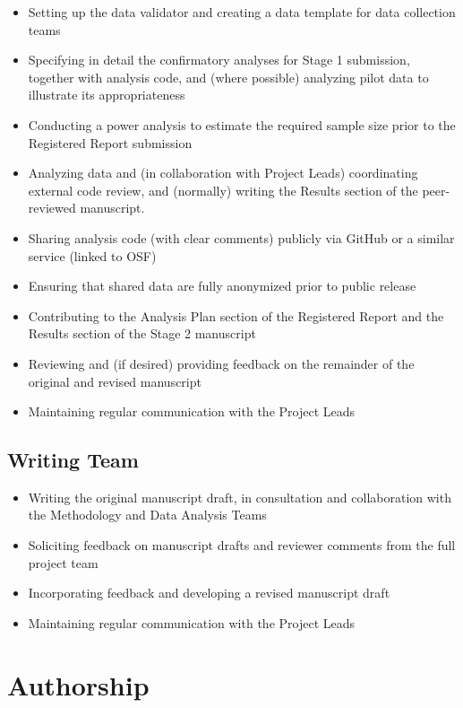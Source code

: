 \documentclass[
  letterpaper,
  DIV=11,
  numbers=noendperiod,
  oneside]{scrreprt}
\providecommand{\tightlist}{%
  \setlength{\itemsep}{0pt}\setlength{\parskip}{0pt}}
\begin{document}
\begin{itemize}
\tightlist
\item
  Setting up the data validator and creating a data template for data
  collection teams
\item
  Specifying in detail the confirmatory analyses for Stage 1 submission,
  together with analysis code, and (where possible) analyzing pilot data
  to illustrate its appropriateness
\item
  Conducting a power analysis to estimate the required sample size prior
  to the Registered Report submission
\item
  Analyzing data and (in collaboration with Project Leads) coordinating
  external code review, and (normally) writing the Results section of
  the peer-reviewed manuscript.
\item
  Sharing analysis code (with clear comments) publicly via GitHub or a
  similar service (linked to OSF)
\item
  Ensuring that shared data are fully anonymized prior to public release
\item
  Contributing to the Analysis Plan section of the Registered Report and
  the Results section of the Stage 2 manuscript
\item
  Reviewing and (if desired) providing feedback on the remainder of the
  original and revised manuscript
\item
  Maintaining regular communication with the Project Leads
\end{itemize}

\subsection{Writing Team}\label{writing-team}

\begin{itemize}
\tightlist
\item
  Writing the original manuscript draft, in consultation and
  collaboration with the Methodology and Data Analysis Teams
\item
  Soliciting feedback on manuscript drafts and reviewer comments from
  the full project team
\item
  Incorporating feedback and developing a revised manuscript draft
\item
  Maintaining regular communication with the Project Leads
\end{itemize}

\section*{Authorship}\label{authorship}
\end{document}
